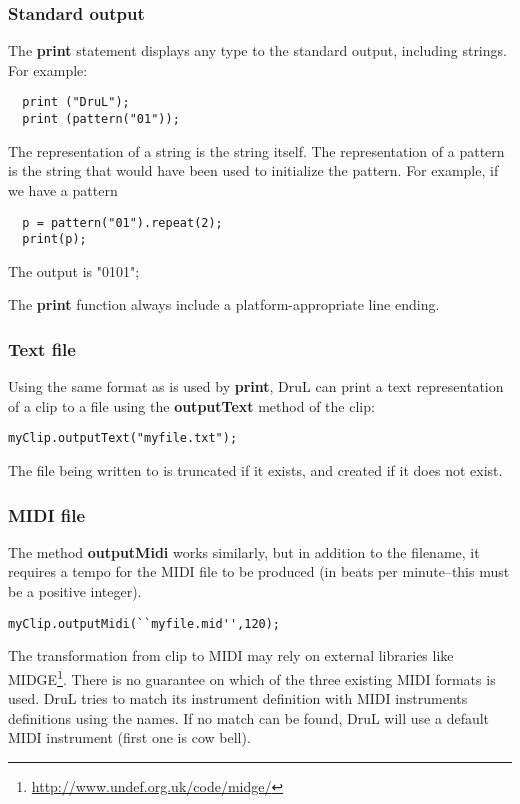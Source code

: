 \subsubsection{Standard output}

The \textbf{print} statement displays any type to the standard
output, including strings. For example:
\begin{verbatim}
  print ("DruL");
  print (pattern("01"));
\end{verbatim}

The representation of a string is the string itself. The representation
of a pattern is the string that would have been used to initialize
the pattern. For example, if we have a pattern
\begin{verbatim}
  p = pattern("01").repeat(2);
  print(p);
\end{verbatim}
The output is "0101";

The \textbf{print} function always include a platform-appropriate line
ending.

\subsubsection{Text file}

Using the same format as is used by \textbf{print}, DruL can print a text representation of a clip to a file
using the \textbf{outputText} method of the clip:

\begin{verbatim}
myClip.outputText("myfile.txt");
\end{verbatim}

The file being written to is truncated if it exists, and created if it does not exist.

\subsubsection{MIDI file}

The method \textbf{outputMidi} works similarly, but in addition to the filename, it requires a tempo for the MIDI file to be produced (in beats per minute--this must be a positive integer).

\begin{verbatim}
myClip.outputMidi(``myfile.mid'',120);
\end{verbatim}

The transformation from clip to MIDI may rely
on external libraries like MIDGE\footnote{\url{http://www.undef.org.uk/code/midge/}}. There is no guarantee on which of the three existing MIDI formats is used.
DruL tries to match its instrument definition with MIDI instruments definitions
using the names. If no match can be found, DruL will use a default MIDI instrument (first one is cow bell).

